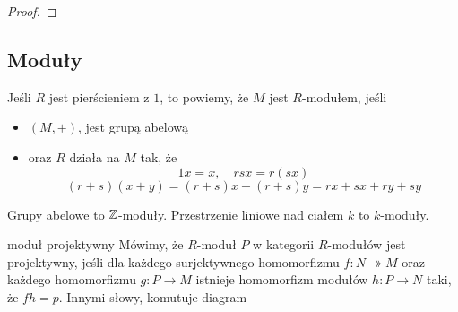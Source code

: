 \begin{proof}
\end{proof}


\subsection{Moduły}

Jeśli $R$ jest pierścieniem z $1$, to powiemy, że $M$ jest $R$-modułem, jeśli
\begin{itemize}
  \item $(M, +)$, jest grupą abelową
  \item oraz $R$ działa na $M$ tak, że 
    $$1x=x,\quad rsx=r(sx)$$
    $$(r+s)(x+y)=(r+s)x+(r+s)y=rx+sx+ry+sy$$
\end{itemize}

Grupy abelowe to $\mathbb{Z}$-moduły. Przestrzenie liniowe nad ciałem $k$ to $k$-moduły.

\begin{definition}{moduł projektywny}{}
  Mówimy, że $R$-moduł $P$ w kategorii $R$-modułów jest projektywny, jeśli dla każdego surjektywnego homomorfizmu $f:N\twoheadrightarrow M$ oraz każdego homomorfizmu $g:P\to M$ istnieje homomorfizm modułów $h:P\to N$ taki, że $fh=p$. Innymi słowy, komutuje diagram
  \begin{center}
  \end{center}
\end{definition}

